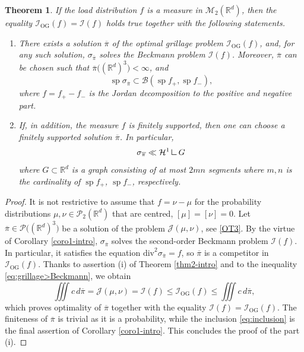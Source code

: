 \documentclass[11pt,letterpaper,reqno]{amsart}
\newtheorem{theorem}{Theorem}[section]
\theoremstyle{definition}
\numberwithin{equation}{section}
\newcommand{\R}{\mathbb{R}}
\newcommand{\Rd}{\R^d}
\newcommand{\ov}{\overline}
\newcommand{\B}{\mathcal{B}}
\newcommand{\Mes}{{\mathcal{M}}}
\newcommand{\dive}{{\mathrm{div}}}
\newcommand{\I}{\mathcal{I}}
\newcommand{\Ha}{\mathcal{H}}
\newcommand{\mres}{\mathbin{\vrule height 1.6ex depth 0pt width
		0.13ex\vrule height 0.13ex depth 0pt width 1.3ex}}
\DeclareMathOperator{\spt}{sp}
\begin{document}
{\begin{theorem}
	\label{cor:grillage}
	If the load distribution $f$ is a measure in $\Mes_2(\R^d)$, then the equality $\mathcal{I}_{\mathrm{OG}}(f) = \I(f)$ holds true together with the following statements.
	 	\begin{enumerate}[label={(\roman*)}] 
	 	\item There exists a solution $\ov{\pi}$ of the optimal grillage problem $	\mathcal{I}_{\mathrm{OG}}(f)$, and, for any such solution, $\sigma_{\ov\pi}$ solves the Beckmann problem $\I(f)$. Moreover, $\ov{\pi}$ can be chosen such  that $\ov\pi\big((\Rd)^3 \big) < \infty$, and 
	 	\begin{equation}
	 		\label{eq:inclusion}
	 		\spt \sigma_{\ov{\pi}} \subset  \B(\spt f_+, \spt f_-),
	 	\end{equation}
	 	where $f = f_+ - f_-$ is the Jordan decomposition to the positive and negative part.
	 	\item If, in addition, the measure $f$ is finitely supported, then one can choose a finitely supported solution $\ov\pi$. In particular, 
	 	\begin{equation*}
	 		\sigma_{\ov{\pi}} \ll \Ha^1 \mres G
	 	\end{equation*}
	 	where $G \subset \Rd$ is a graph consisting of at most $2 m n$ segments where $m,n$ is the cardinality of $\spt f_+$, $\spt f_-$, respectively.
	 \end{enumerate}
\end{theorem}
\begin{proof}
It is not restrictive to assume that $f = \nu -\mu$ for the probability distributions $\mu,\nu \in \mathcal{P}_2(\Rd)$ that are centred, $[\mu]=[\nu]=0$. Let $\ov\pi \in  \mathcal{P}\big((\Rd)^3\big)$ be a solution of the problem $\mathcal{J}(\mu,\nu)$, see \eqref{OT3}. By the virtue of Corollary \ref{coro1-intro}, $\sigma_{\ov{\pi}}$ solves the second-order Beckmann problem $\I(f)$. In particular, it satisfies the equation $\dive^2 \sigma_{\ov\pi} = f$, so  $\ov{\pi}$ is a competitor in $\I_{\mathrm{OG}}(f)$. Thanks to assertion (i) of Theorem \ref{thm2-intro} and to the inequality \eqref{eq:grillage>Beckmann}, we obtain
	\begin{equation*}
		\iiint c \,d\ov\pi = \mathcal{J}(\mu,\nu) = \I(f) \leq \I_{\mathrm{OG}}(f) \leq \iiint c \,d\ov\pi,
	\end{equation*}
	which proves optimality of $\ov\pi$ together with the equality $\I(f) = \mathcal{I}_{\mathrm{OG}}(f)$. The finiteness of $\ov{\pi}$ is trivial as it is a probability, while the inclusion \eqref{eq:inclusion} is the final assertion of Corollary \ref{coro1-intro}. This concludes the proof of the part (i).
	

\end{proof}}
\end{document}
